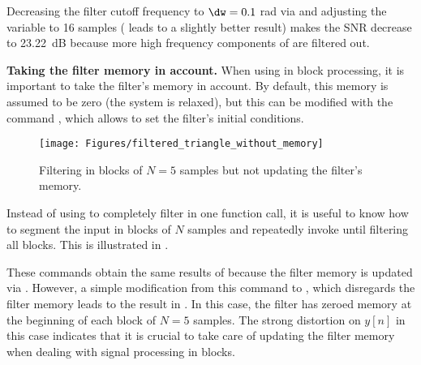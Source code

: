 Decreasing the filter cutoff frequency to $\dw=0.1$ rad via  and adjusting the variable  to 16 samples ( leads to a slightly better result) makes the SNR decrease to 23.22~dB because more high frequency components of  are filtered out.
\eApplication

\bApplication \textbf{Taking the filter memory in account.}
\label{app:filterMemoryInAccount}
When using  in block processing, it is important to take the filter's memory in account. By default, this memory is assumed to be zero (the system is relaxed), but this can be modified with the command , which allows to set the filter's initial conditions.

\begin{figure}
\centering
\texttt{[image: Figures/filtered\_triangle\_without\_memory]}
\caption{Filtering in blocks of $N=5$ samples but not updating the filter's memory.\label{fig:filtered_triangle_without_memory}}
\end{figure}

Instead of using  to completely filter  in one function call, it is useful to know how to segment the input  in blocks of $N$ samples and repeatedly invoke  until filtering all blocks. This is illustrated in .

These commands obtain the same results of  because the filter memory is updated via . 
However, a simple modification from this command to , which disregards the filter memory leads to the result in . In this case, the filter has zeroed memory at the beginning of each block of $N=5$ samples. The strong distortion on $y[n]$ in this case indicates that it is crucial to take care of updating the filter memory when dealing with signal processing in blocks.
\eApplication

